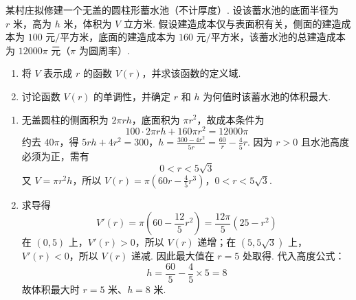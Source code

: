 \begin{problem}
某村庄拟修建一个无盖的圆柱形蓄水池（不计厚度）. 设该蓄水池的底面半径为 \(r\text{ 米}\)，高为 \(h\text{ 米}\)，体积为 \(V\text{ 立方米}\). 假设建造成本仅与表面积有关，侧面的建造成本为 \(100\text{ 元/平方米}\)，底面的建造成本为 \(160\text{ 元/平方米}\)，该蓄水池的总建造成本为 \(12000\pi\text{ 元}\)（\(\pi\) 为圆周率）.
\begin{enumerate}
\item 将 \(V\) 表示成 \( r \) 的函数 \( V(r) \)，并求该函数的定义域.
\item 讨论函数 \( V(r) \) 的单调性，并确定 \(r\) 和 \(h\) 为何值时该蓄水池的体积最大.
\end{enumerate}
\begin{solution}
\begin{enumerate}
\item 无盖圆柱的侧面积为 \(2\pi rh\)，底面积为 \(\pi r^2\)，故成本条件为
\[
100\cdot2\pi rh+160\pi r^2=12000\pi
\]
约去 \(40\pi\)，得
\(5rh+4r^2=300\)，\(h=\frac{300-4r^2}{5r}=\frac{60}{r}-\frac45r\).
因为 \(r>0\) 且水池高度必须为正，需有
\[
0<r<5\sqrt3
\]
又 \(V=\pi r^2h\)，所以
\(V(r)=\pi\left(60r-\frac45r^3\right)\)，\(0<r<5\sqrt3\).
\item 求导得
\[
V'(r)=\pi\left(60-\frac{12}{5}r^2\right)
=\frac{12\pi}{5}(25-r^2)
\]
在 \((0,5)\) 上，\(V'(r)>0\)，所以 \(V(r)\) 递增；在 \((5,5\sqrt3)\) 上，\(V'(r)<0\)，所以 \(V(r)\) 递减. 因此最大值在 \(r=5\) 处取得. 代入高度公式：
\[
h=\frac{60}{5}-\frac45\times5=8
\]
故体积最大时 \(r=5\) 米、\(h=8\) 米.
\end{enumerate}
\end{solution}
\end{problem}

